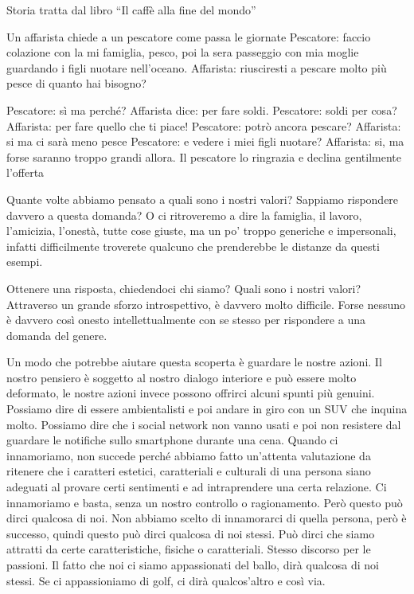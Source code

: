 \documentclass[12pt]{book} %
\begin{document}
\begin{mdframed}[linewidth=1pt]
Storia tratta dal libro “Il caffè alla fine del
mondo”

Un affarista chiede a un pescatore come passa le giornate\newline
Pescatore: faccio colazione con la mi famiglia, pesco, poi la sera passeggio con mia moglie guardando i figli nuotare
nell'oceano.\newline
Affarista: riusciresti a pescare molto più pesce di quanto hai bisogno?

Pescatore: sì ma perché? \newline
Affarista dice: per fare soldi. \newline
Pescatore: soldi per cosa? \newline
Affarista: per fare quello che ti piace! \newline
Pescatore: potrò ancora pescare?\newline
Affarista: si ma ci sarà meno pesce\newline
Pescatore: e vedere i miei figli nuotare?\newline
Affarista: si, ma forse saranno troppo grandi allora.\newline
Il pescatore lo ringrazia e declina gentilmente l'offerta 
\end{mdframed}

Quante volte abbiamo pensato a quali sono i nostri valori?
Sappiamo rispondere davvero a questa domanda? O ci ritroveremo a dire la famiglia, il lavoro,
l'amicizia, l'onestà, tutte cose giuste, ma un po' troppo generiche e impersonali, infatti difficilmente troverete qualcuno che prenderebbe le distanze da questi esempi.

Ottenere una risposta, chiedendoci chi siamo? Quali sono i nostri valori? Attraverso un grande sforzo introspettivo, è
davvero molto difficile. Forse nessuno è davvero così onesto intellettualmente con se stesso per rispondere a una
domanda del genere. 

Un modo che potrebbe aiutare questa scoperta è guardare le nostre azioni. Il nostro pensiero è soggetto al nostro
dialogo interiore e può essere molto deformato, le nostre azioni invece possono offrirci alcuni spunti più genuini.
Possiamo dire di essere ambientalisti e poi andare in giro con un SUV che inquina molto. Possiamo
dire che i social network non vanno usati e poi non resistere dal guardare le notifiche sullo smartphone durante una
cena. Quando ci innamoriamo, non succede perché abbiamo fatto
un'attenta valutazione da ritenere che i caratteri estetici, caratteriali e culturali di una persona siano
adeguati al provare certi sentimenti e ad intraprendere una certa relazione. Ci innamoriamo e basta, senza un nostro
controllo o ragionamento. Però questo può dirci qualcosa di noi. Non abbiamo scelto di innamorarci di quella persona,
però è successo, quindi questo può dirci qualcosa di noi stessi. Può dirci che siamo attratti da certe caratteristiche, fisiche o caratteriali.
Stesso discorso per le passioni. Il fatto che noi ci siamo appassionati del ballo, dirà qualcosa di noi stessi. Se ci appassioniamo di golf, ci dirà qualcos'altro e così via. 
\end{document}
